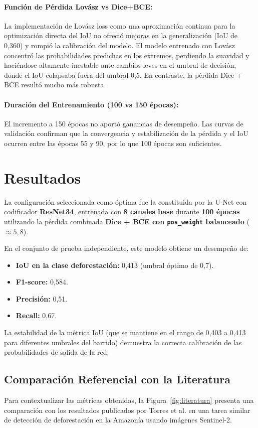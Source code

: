 \documentclass{article}
\begin{document}
\paragraph{Función de Pérdida Lovász vs Dice+BCE:}
La implementación de Lovász loss como una aproximación continua para la optimización directa del IoU no ofreció mejoras en la generalización (IoU de 0,360) y rompió la calibración del modelo. El modelo entrenado con Lovász concentró las probabilidades predichas en los extremos, perdiendo la suavidad y haciéndose altamente inestable ante cambios leves en el umbral de decisión, donde el IoU colapsaba fuera del umbral 0,5. En contraste, la pérdida Dice + BCE resultó mucho más robusta.

\paragraph{Duración del Entrenamiento (100 vs 150 épocas):}
El incremento a 150 épocas no aportó ganancias de desempeño. Las curvas de validación confirman que la convergencia y estabilización de la pérdida y el IoU ocurren entre las épocas 55 y 90, por lo que 100 épocas son suficientes.

\section{Resultados}
La configuración seleccionada como óptima fue la constituida por la U-Net con codificador \textbf{ResNet34}, entrenada con \textbf{8 canales base} durante \textbf{100 épocas} utilizando la pérdida combinada \textbf{Dice + BCE con \texttt{pos\_weight} balanceado} ($\approx 5{,}8$). 

En el conjunto de prueba independiente, este modelo obtiene un desempeño de:
\begin{itemize}
    \item \textbf{IoU en la clase deforestación:} 0,413 (umbral óptimo de 0,7).
    \item \textbf{F1-score:} 0,584.
    \item \textbf{Precisión:} 0,51.
    \item \textbf{Recall:} 0,67.
\end{itemize}
La estabilidad de la métrica IoU (que se mantiene en el rango de 0,403 a 0,413 para diferentes umbrales del barrido) demuestra la correcta calibración de las probabilidades de salida de la red.

\subsection*{Comparación Referencial con la Literatura}
Para contextualizar las métricas obtenidas, la Figura~\ref{fig:literatura} presenta una comparación con los resultados publicados por Torres et al. \cite{torres2021deforestation} en una tarea similar de detección de deforestación en la Amazonía usando imágenes Sentinel-2.
\end{document}
